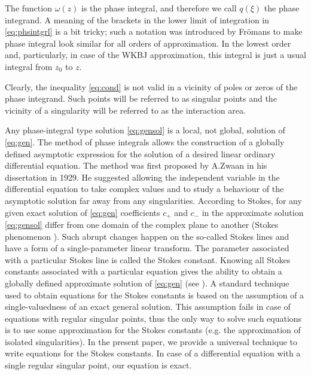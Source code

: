 \documentclass[aip,jmp,reprint]{revtex4-1}
\def\w{\omega}
\newcommand\phsintgrnd[1][z]{q(#1)}
\begin{document}
The function $\w(z)$ is the phase integral, and therefore we call $\phsintgrnd[\xi]$ 
the phase integrand. A meaning of the brackets in the lower limit of integration in \eqref{eq:phsintgrl}
is a bit tricky; such a notation was introduced by Fr\"omans \cite{frpaper} to make
phase integral look similar for all orders of approximation. In the lowest order and, particularly,
in case of the WKBJ approximation, this integral is just a usual integral from $z_0$ to $z$. 

Clearly, the inequality \eqref{eq:cond} is not valid in a vicinity of poles or zeros of 
the phase integrand. Such points will be referred to as singular points and the 
vicinity of a singularity will be referred to as the interaction area.

Any phase-integral type solution \eqref{eq:gensol} is a local, not global, solution of \eqref{eq:gen}. 
The method of phase integrals allows the construction of a globally defined 
asymptotic expression for the solution of a desired linear ordinary differential 
equation. The method was first proposed by A.Zwaan\cite{zwaan} in his dissertation in 1929. 
He suggested allowing the independent variable in the differential equation to take 
complex values and to study a behaviour of the asymptotic solution far away from any 
singularities. According to Stokes\cite{stokes}, for any given exact solution 
of \eqref{eq:gen} coefficients $c_+$ and $c_-$ in the approximate solution \eqref{eq:gensol} 
differ from one domain of the complex plane to another 
(Stokes phenomenon \cite{stokes,rwbook,heading,frbook}). Such abrupt 
changes happen on the so-called Stokes lines and have a form of a single-parameter 
linear transform\cite{heading}. The parameter associated with a particular Stokes line 
is called the Stokes constant. Knowing all Stokes constants associated with a particular 
equation gives the ability to obtain a globally defined approximate solution 
of \eqref{eq:gen} (see ). A standard technique\cite{frpaper} used to obtain
equations for the Stokes constants is based on the assumption of a single-valuedness of
an exact general solution. This assumption fails in case of equations with regular singular points\cite{cbbook}, thus
the only way to solve such equations is to use some approximation for the Stokes constants\cite{rwbook, ours}
(e.g. the approximation of isolated singularities\cite{rwbook}). In the present paper, we provide a universal
technique to write equations for the Stokes constants. In case of a differential equation with
a single regular singular point, our equation is exact.
\end{document}
